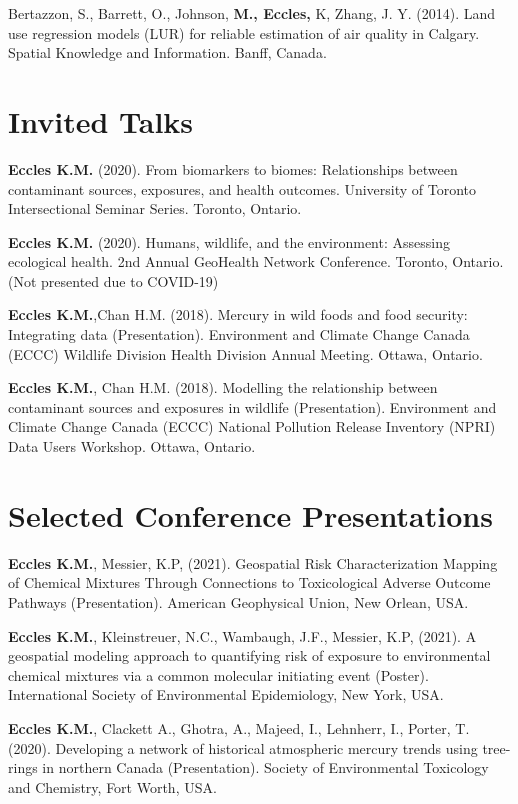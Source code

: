 \documentclass[margin,line]{res}
\begin{document}
\begin{resume}
Bertazzon, S., Barrett, O., Johnson, \textbf{M., Eccles,} K, Zhang, J. Y. (2014). Land use regression models (LUR) for reliable estimation of air quality in Calgary. Spatial Knowledge and Information. Banff, Canada.\\

\vspace*{.1in}
\section{\sc Invited Talks}
\textbf{Eccles K.M. }(2020). From biomarkers to biomes: Relationships between contaminant sources, exposures, and health outcomes. University of Toronto Intersectional Seminar Series. Toronto, Ontario.

\textbf{Eccles K.M. }(2020). Humans, wildlife, and the environment: Assessing ecological health. 2nd Annual GeoHealth Network Conference. Toronto, Ontario. (Not presented due to COVID-19)

\textbf{Eccles K.M.},Chan H.M. (2018). Mercury in wild foods and food security: Integrating data (Presentation). Environment and Climate Change Canada (ECCC) Wildlife Division Health Division Annual Meeting. Ottawa, Ontario.

\textbf{Eccles K.M.}, Chan H.M. (2018). Modelling the relationship between contaminant sources and exposures in wildlife (Presentation). Environment and Climate Change Canada (ECCC) National Pollution Release Inventory (NPRI) Data Users Workshop. Ottawa, Ontario.

\vspace*{.1in}
\section{\sc Selected Conference Presentations}

\textbf{Eccles K.M.}, Messier, K.P, (2021). Geospatial Risk Characterization Mapping of Chemical Mixtures Through Connections to Toxicological Adverse Outcome Pathways (Presentation). American Geophysical Union, New Orlean, USA.

\textbf{Eccles K.M.}, Kleinstreuer, N.C., Wambaugh, J.F., Messier, K.P, (2021). A geospatial modeling approach to quantifying risk of exposure to environmental chemical mixtures via a common molecular initiating event (Poster). International Society of Environmental Epidemiology, New York, USA.

\textbf{Eccles K.M.}, Clackett A., Ghotra, A., Majeed, I., Lehnherr, I., Porter, T. (2020). Developing a network of historical atmospheric mercury trends using tree-rings in northern Canada (Presentation).  Society of Environmental Toxicology and Chemistry, Fort Worth, USA.


\end{resume}
\end{document}
